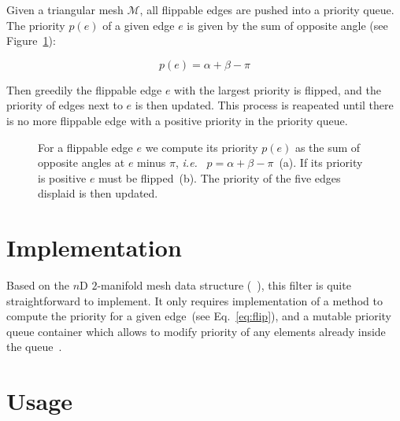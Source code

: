 \documentclass{InsightArticle}
\def \ie {\textit{i.e. }}
\begin{document}
Given a triangular mesh $\mathcal{M}$, all flippable edges are pushed into a priority queue. The priority $p(e)$ of a given edge $e$ is given by the sum of opposite angle (see Figure~\ref{fig:flip}):

\begin{equation}
  p(e) = \alpha + \beta - \pi \label{eq:flip}
\end{equation}

Then greedily the flippable edge $e$ with the largest priority is flipped, and the priority of edges next to $e$ is then updated. This process is reapeated until there is no more flippable edge with a positive priority in the priority queue.

\begin{figure}[t]
  \centering
  \hspace{2cm}
  \caption{For a flippable edge $e$ we compute its priority $p(e)$ as the sum of opposite angles at $e$ minus $\pi$, \ie~$p = \alpha + \beta - \pi$~(a). If its priority is positive $e$ must be flipped~(b). The priority of the five edges displaid is then updated.}
  \label{fig:flip}
\end{figure}

\section{Implementation}
Based on the $n$D $2$-manifold mesh data structure (~\cite{itkQE}), this filter is quite straightforward to implement. It only requires implementation of a method to compute the priority for a given edge~(see Eq.~\ref{eq:flip}), and a mutable priority queue container which allows to modify priority of any elements already inside the queue~\cite{itkPriorityQueueContainer}.

\section{Usage}
\end{document}

